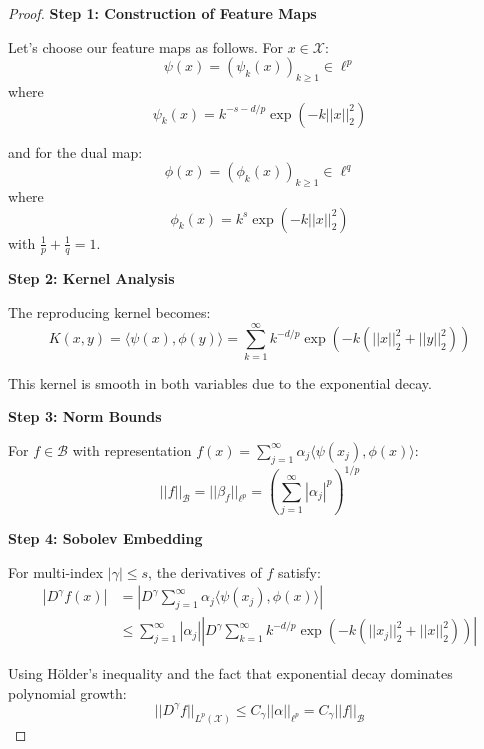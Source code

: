 \begin{proof}
\textbf{Step 1: Construction of Feature Maps}

Let's choose our feature maps as follows. For $x \in \mathcal{X}$:
\begin{equation}
\psi(x) = (\psi_k(x))_{k\ge 1} \in \ell^p
\end{equation}
where
\begin{equation}
\psi_k(x) = k^{-s-d/p}\exp(-k||x||_2^2)
\end{equation}

and for the dual map:
\begin{equation}
\phi(x) = (\phi_k(x))_{k\ge 1} \in \ell^q
\end{equation}
where
\begin{equation}
\phi_k(x) = k^{s}\exp(-k||x||_2^2)
\end{equation}
with $\frac{1}{p} + \frac{1}{q} = 1$.

\textbf{Step 2: Kernel Analysis}

The reproducing kernel becomes:
\begin{equation}
K(x,y) = \langle \psi(x), \phi(y)\rangle = \sum_{k=1}^\infty k^{-d/p}\exp(-k(||x||_2^2 + ||y||_2^2))
\end{equation}

This kernel is smooth in both variables due to the exponential decay.

\textbf{Step 3: Norm Bounds}

For $f \in \mathcal{B}$ with representation $f(x) = \sum_{j=1}^\infty \alpha_j \langle \psi(x_j), \phi(x)\rangle$:
\begin{equation}
||f||_{\mathcal{B}} = ||\beta_f||_{\ell^p} = \left(\sum_{j=1}^\infty |\alpha_j|^p\right)^{1/p}
\end{equation}

\textbf{Step 4: Sobolev Embedding}

For multi-index $|\gamma| \leq s$, the derivatives of $f$ satisfy:
\begin{align}
|D^\gamma f(x)| &= \left|D^\gamma \sum_{j=1}^\infty \alpha_j \langle \psi(x_j), \phi(x)\rangle\right| \\
&\leq \sum_{j=1}^\infty |\alpha_j| \left|D^\gamma \sum_{k=1}^\infty k^{-d/p}\exp(-k(||x_j||_2^2 + ||x||_2^2))\right|
\end{align}

Using Hölder's inequality and the fact that exponential decay dominates polynomial growth:
\begin{equation}
||D^\gamma f||_{L^p(\mathcal{X})} \leq C_\gamma ||\alpha||_{\ell^p} = C_\gamma ||f||_{\mathcal{B}}
\end{equation}


\end{proof}

